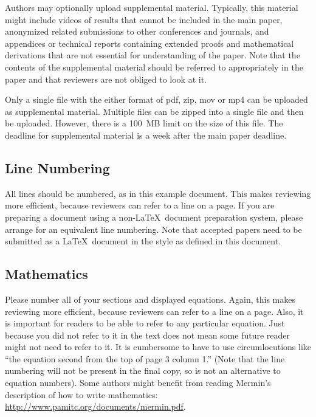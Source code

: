 \documentclass[runningheads]{llncs}
\begin{document}
Authors may optionally upload supplemental material. Typically, this
material might include videos of results that cannot be included in
the main paper, anonymized related submissions to other conferences
and journals, and appendices or technical reports containing extended
proofs and mathematical derivations that are not essential for
understanding of the paper. Note that the contents of the supplemental
material should be referred to appropriately in the paper and that
reviewers are not obliged to look at it.

Only a single file with the either format of pdf, zip, mov or mp4 can be uploaded as supplemental material. Multiple files can be zipped into a single file and then be uploaded. However, there is a 100~MB limit on the size of this file. The deadline for supplemental material is a week after the main paper deadline.

\subsection{Line Numbering}

All lines should be numbered, as in this example document. This makes
reviewing more efficient, because reviewers can refer to a line on a
page. If you are preparing a document using a non-\LaTeX\
document preparation system, please arrange for an equivalent line numbering. Note that accepted papers need to be submitted as a \LaTeX\
document in the style as defined in this document.

\subsection{Mathematics}

Please number all of your sections and displayed equations.  Again,
this makes reviewing more efficient, because reviewers can refer to a
line on a page.  Also, it is important for readers to be able to refer
to any particular equation.  Just because you did not refer to it in
the text does not mean some future reader might not need to refer to
it.  It is cumbersome to have to use circumlocutions like ``the
equation second from the top of page 3 column 1.''  (Note that the
line numbering will not be present in the final copy, so is not an
alternative to equation numbers).  Some authors might benefit from
reading Mermin's description of how to write mathematics:
\url{http://www.pamitc.org/documents/mermin.pdf}.
\end{document}
